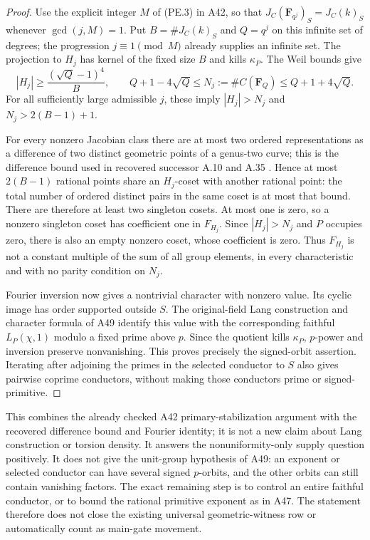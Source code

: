 \documentclass[11pt,a4paper]{article}
\begin{document}
\begin{proof}
Use the explicit integer $M$ of (PE.3) in A42, so that
$J_C(\mathbf F_{q^j})_S=J_C(k)_S$ whenever $\gcd(j,M)=1$.
Put $B=\#J_C(k)_S$ and $Q=q^j$ on this infinite set of degrees;
the progression $j\equiv1\pmod M$ already supplies an infinite set.
The projection to $H_j$ has kernel of the fixed size $B$ and
kills $\kappa_P$. The Weil bounds \cite[Theorem~19.1]{MilneAV} give
\[
 |H_j|\ge\frac{(\sqrt Q-1)^4}{B},\qquad
 Q+1-4\sqrt Q\le N_j:=\#C(\mathbf F_Q)
                         \le Q+1+4\sqrt Q.
\]
For all sufficiently large admissible $j$, these imply
$|H_j|>N_j$ and $N_j>2(B-1)+1$.

For every nonzero Jacobian class there are at most two ordered
representations as a difference of two distinct geometric points
of a genus-two curve; this is the difference bound used in recovered
successor A.10 and A.35 \cite[A.10, A.35]{ASrun}.
Hence at most $2(B-1)$ rational points
share an $H_j$-coset with another rational point: the total number
of ordered distinct pairs in the same coset is at most that bound.
There are therefore at least two singleton cosets. At most one
is zero, so a nonzero singleton coset has coefficient one in
$F_{H_j}$. Since $|H_j|>N_j$ and $P$ occupies zero, there is
also an empty nonzero coset, whose coefficient is zero.
Thus $F_{H_j}$ is not a constant multiple of the sum of all
group elements, in every characteristic and with no parity
condition on $N_j$.

Fourier inversion now gives a nontrivial character with nonzero
value. Its cyclic image has order supported outside $S$.
The original-field Lang construction and character formula of
A49 identify this value with the corresponding faithful
$L_P(\chi,1)$ modulo a fixed prime above $p$.
Since the quotient kills $\kappa_P$, $p$-power and inversion
preserve nonvanishing. This proves precisely the signed-orbit
assertion. Iterating after adjoining the primes in the selected
conductor to $S$ also gives pairwise coprime conductors, without
making those conductors prime or signed-primitive.
\end{proof}

This combines the already checked A42 primary-stabilization
argument with the recovered difference bound and Fourier identity;
it is not a new claim about Lang construction or torsion density.
It answers the nonuniformity-only supply question positively.
It does not give the unit-group hypothesis of A49: an exponent
or selected conductor can have several signed $p$-orbits, and
the other orbits can still contain vanishing factors. The exact
remaining step is to control an entire faithful conductor,
or to bound the rational primitive exponent as in A47.
The statement therefore does not close the existing universal
geometric-witness row or automatically count as main-gate movement.
\end{document}
